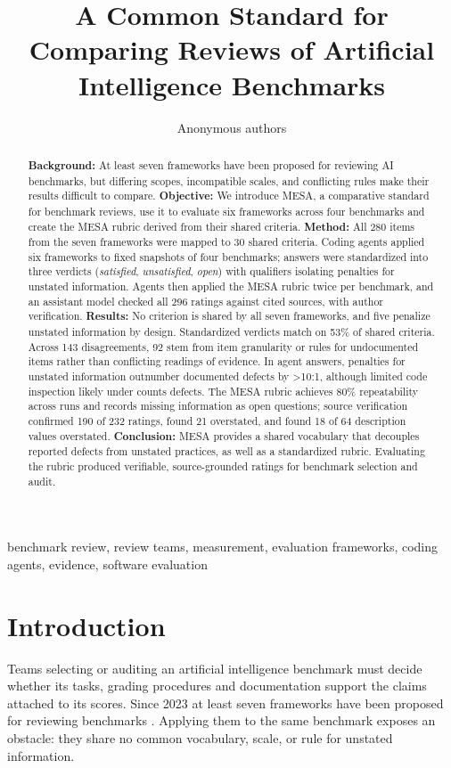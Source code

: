 \documentclass[10pt,conference]{IEEEtran}
\begin{document}
\title{A Common Standard for Comparing Reviews of Artificial Intelligence Benchmarks}
\author{Anonymous authors}
\maketitle
\begin{abstract}
\textbf{Background:} At least seven frameworks have been proposed for reviewing AI benchmarks, but differing scopes, incompatible scales, and conflicting rules make their results difficult to compare.
\textbf{Objective:} We introduce MESA, a comparative standard for benchmark reviews, use it to evaluate six frameworks across four benchmarks and create the MESA rubric derived from their shared criteria.
\textbf{Method:} All 280 items from the seven frameworks were mapped to 30 shared criteria. Coding agents applied six frameworks to fixed snapshots of four benchmarks; answers were standardized into three verdicts (\emph{satisfied}, \emph{unsatisfied}, \emph{open}) with qualifiers isolating penalties for unstated information. Agents then applied the MESA rubric twice per benchmark, and an assistant model checked all 296 ratings against cited sources, with author verification.
\textbf{Results:} No criterion is shared by all seven frameworks, and five penalize unstated information by design. Standardized verdicts match on 53\% of shared criteria. Across 143 disagreements, 92 stem from item granularity or rules for undocumented items rather than conflicting readings of evidence. In agent answers, penalties for unstated information outnumber documented defects by >10:1, although limited code inspection likely under counts defects. The MESA rubric achieves 80\% repeatability across runs and records missing information as open questions; source verification confirmed 190 of 232 ratings, found 21 overstated, and found 18 of 64 description values overstated.
\textbf{Conclusion:} MESA provides a shared vocabulary that decouples reported defects from unstated practices, as well as a standardized rubric. Evaluating the rubric produced verifiable, source-grounded ratings for benchmark selection and audit.
\end{abstract}
\begin{IEEEkeywords}
benchmark review, review teams, measurement, evaluation frameworks, coding agents, evidence, software evaluation
\end{IEEEkeywords}

\section{Introduction}
Teams selecting or auditing an artificial intelligence benchmark must decide whether its tasks, grading procedures and documentation support the claims attached to its scores. Since 2023 at least seven frameworks have been proposed for reviewing benchmarks \cite{cohn_hernandez_orallo_oecd_2023,reuel_betterbench,liu_ecbd_2024,cao_how2bench_2025,zhu_agentic_benchmark_checklist_2025,san_joaquin_scorecard_2026,corona_benchmark_caliper_2026}. Applying them to the same benchmark exposes an obstacle: they share no common vocabulary, scale, or rule for unstated information.
\end{document}
